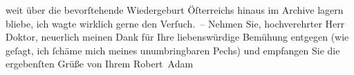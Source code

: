\begin{ledgroupsized}[t]{13cm}
                   weit über die bevorſtehende Wiedergeburt Öſterreichs hinaus im Archive lagern bliebe, ich
               wagte wirklich gerne den Verſuch. –\pend
           \pstart
           Nehmen Sie, hochverehrter Herr Doktor, neuerlich meinen Dank für Ihre liebenswürdige
               Bemühung entgegen (wie geſagt, ich ſchäme mich meines unumbringbaren Pechs) und
               empfangen Sie die ergebenſten Grüße von Ihrem\pend
           \pstart \spacefill\mbox{Robert Adam}\pend{}
         
         \endnumbering{}\end{ledgroupsized}  \newcommand{\dateiname}{L02260}\newcommand{\titel}{Robert Adam an Arthur Schnitzler, 16. 5. 1917}\newcommand{\editorInnen}{Martin Anton Müller und Gerd-Hermann Susen}
      